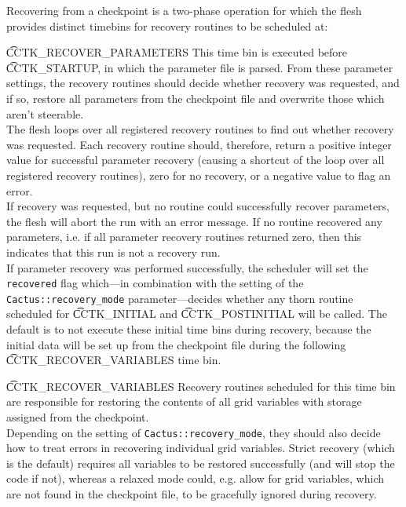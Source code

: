 Recovering from a checkpoint is a two-phase operation for which the flesh
provides distinct timebins for recovery routines to be scheduled at:
%
\begin{Lentry}
  \item[{\t CCTK\_RECOVER\_PARAMETERS}] This time bin is executed before
    {\t CCTK\_STARTUP}, in which the parameter file is parsed. From these parameter
    settings, the recovery routines should decide whether recovery was
    requested, and if so, restore all parameters from the checkpoint file and
    overwrite those which aren't steerable.\\
    The flesh loops over all registered recovery routines to find out
    whether recovery was requested. Each recovery routine should, therefore,
    return a positive integer value for successful parameter recovery (causing
    a shortcut of the loop over all registered recovery routines),
    zero for no recovery, or a negative value to flag an error.\\
    If recovery was requested, but no routine could successfully recover
    parameters, the flesh will abort the run with an error message.
    If no routine recovered any parameters, i.e. if all parameter
    recovery routines returned zero, then this indicates that this run
    is not a recovery run.\\
    If parameter recovery was performed successfully, the scheduler will set the
    {\tt recovered} flag which---in combination with the setting of the {\tt
    Cactus::recovery\_mode} parameter---decides whether any thorn routine
    scheduled for {\t CCTK\_INITIAL} and {\t CCTK\_POSTINITIAL} will be called.
    The default is to not execute these initial time bins during recovery, 
    because the initial data will be set up from the checkpoint file during the
    following {\t CCTK\_RECOVER\_VARIABLES} time bin.
  \item[{\t CCTK\_RECOVER\_VARIABLES}]
    Recovery routines scheduled for this time bin are responsible for restoring
    the contents of all grid variables with storage assigned from the
    checkpoint.\\
    Depending on the setting of {\tt Cactus::recovery\_mode}, they should also
    decide how to treat errors in recovering individual grid variables. Strict
    recovery (which is the default) requires all variables to be restored
    successfully (and will stop the code if not), whereas a relaxed mode
    could, e.g. allow for grid variables, which are not found in the checkpoint
    file, to be gracefully ignored during recovery.
\end{Lentry}


